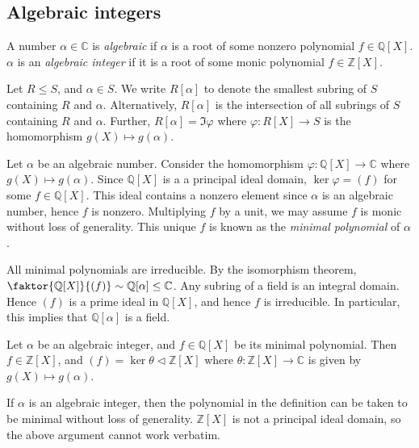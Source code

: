 \subsection{Algebraic integers}
\begin{definition}
	A number \( \alpha \in \mathbb C \) is \textit{algebraic} if \( \alpha \) is a root of some nonzero polynomial \( f \in \mathbb Q[X] \).
	\( \alpha \) is an \textit{algebraic integer} if it is a root of some monic polynomial \( f \in \mathbb Z[X] \).
\end{definition}
Let \( R \leq S \), and \( \alpha \in S \).
We write \( R[\alpha] \) to denote the smallest subring of \( S \) containing \( R \) and \( \alpha \).
Alternatively, \( R[\alpha] \) is the intersection of all subrings of \( S \) containing \( R \) and \( \alpha \).
Further, \( R[\alpha] = \Im \varphi \) where \( \varphi \colon R[X] \to S \) is the homomorphism \( g(X) \mapsto g(\alpha) \).
\begin{definition}
	Let \( \alpha \) be an algebraic number.
	Consider the homomorphism \( \varphi \colon \mathbb Q[X] \to \mathbb C \) where \( g(X) \mapsto g(\alpha) \).
	Since \( \mathbb Q[X] \) is a a principal ideal domain, \( \ker \varphi = (f) \) for some \( f \in \mathbb Q[X] \).
	This ideal contains a nonzero element since \( \alpha \) is an algebraic number, hence \( f \) is nonzero.
	Multiplying \( f \) by a unit, we may assume \( f \) is monic without loss of generality.
	This unique \( f \) is known as the \textit{minimal polynomial} of \( \alpha \).
\end{definition}
\begin{corollary}
	All minimal polynomials are irreducible.
	By the isomorphism theorem, \( \faktor{\mathbb Q[X]}{(f)} \sim \mathbb Q[\alpha] \leq \mathbb C \).
	Any subring of a field is an integral domain.
	Hence \( (f) \) is a prime ideal in \( \mathbb Q[X] \), and hence \( f \) is irreducible.
	In particular, this implies that \( \mathbb Q[\alpha] \) is a field.
\end{corollary}
\begin{proposition}
	Let \( \alpha \) be an algebraic integer, and \( f \in \mathbb Q[X] \) be its minimal polynomial.
	Then \( f \in \mathbb Z[X] \), and \( (f) = \ker \theta \triangleleft \mathbb Z[X] \) where \( \theta \colon \mathbb Z[X] \to \mathbb C \) is given by \( g(X) \mapsto g(\alpha) \).
\end{proposition}
\begin{remark}
	If \( \alpha \) is an algebraic integer, then the polynomial in the definition can be taken to be minimal without loss of generality.
	\( \mathbb Z[X] \) is not a principal ideal domain, so the above argument cannot work verbatim.
\end{remark}
